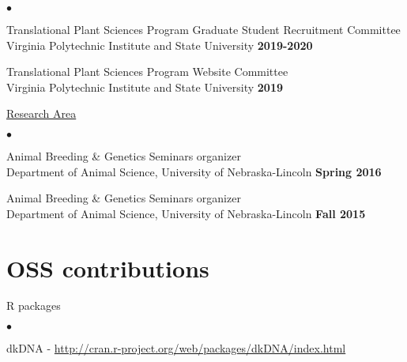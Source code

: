 \documentclass[margin,line,10pt]{res}
\newenvironment{list1}{
  \begin{list}{\ding{113}}{%
      \setlength{\itemsep}{0in}
      \setlength{\parsep}{0in} \setlength{\parskip}{0in}
      \setlength{\topsep}{0in} \setlength{\partopsep}{0in} 
      \setlength{\leftmargin}{0.17in}}}{\end{list}}
\newenvironment{list2}{
  \begin{list}{$\bullet$}{%
      \setlength{\itemsep}{0in}
      \setlength{\parsep}{0in} \setlength{\parskip}{0in}
      \setlength{\topsep}{0in} \setlength{\partopsep}{0in} 
      \setlength{\leftmargin}{0.2in}}}{\end{list}}
\begin{document}
\begin{resume}
\begin{list2}
  \vspace{0.3cm}


\item Translational Plant Sciences Program Graduate Student Recruitment Committee \\
  Virginia Polytechnic Institute and State University  \hfill \textbf{2019-2020}\\

  \vspace{0.3cm}
  
\item Translational Plant Sciences Program Website  Committee \\
  Virginia Polytechnic Institute and State University  \hfill \textbf{2019}\\

\end{list2}


\begin{flushleft}
\hspace{0.3cm} \underline{Research Area}
\end{flushleft}
\begin{list2}
\item Animal Breeding \& Genetics Seminars organizer \\
  Department of Animal Science, University of Nebraska-Lincoln   \hfill \textbf{Spring 2016}\\

\item Animal Breeding \& Genetics Seminars organizer \\
  Department of Animal Science, University of Nebraska-Lincoln   \hfill \textbf{Fall 2015}\\
\end{list2}






\vspace{0.5cm}
\section{\sc OSS contributions} 
\begin{list1}
\item[] R packages
\begin{list2}
\item dkDNA - \textcolor{blue}{\href{http://cran.r-project.org/web/packages/dkDNA/index.html}{http://cran.r-project.org/web/packages/dkDNA/index.html}}
\end{list2}



\end{list1}
\end{resume}
\end{document}
